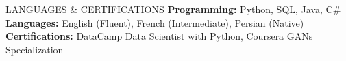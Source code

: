 \documentclass{resume}
\begin{document}
\begin{rSection}{LANGUAGES \& CERTIFICATIONS}
\textbf{Programming:} Python, SQL, Java, C\# \hfill \textbf{Languages:} English (Fluent), French (Intermediate), Persian (Native)\\
\textbf{Certifications:} DataCamp Data Scientist with Python, Coursera GANs Specialization
\end{rSection}
\end{document}
